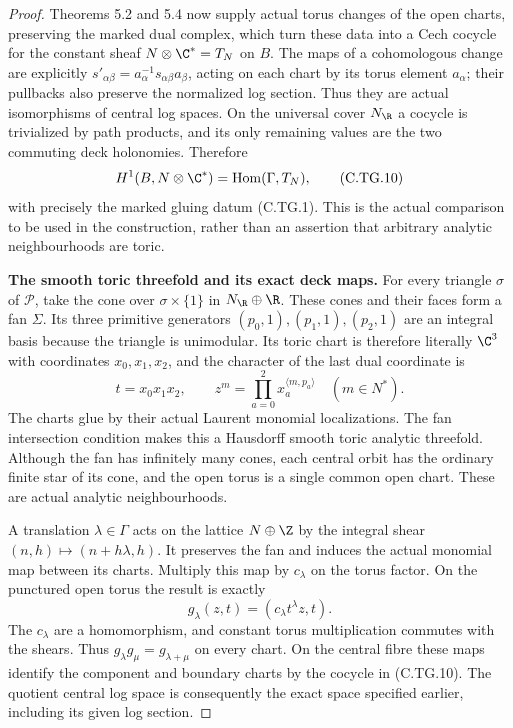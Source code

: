 \begin{proof}
Theorems 5.2 and 5.4 now supply actual torus
changes of the open charts, preserving the
marked dual complex, which turn these data
into a Cech cocycle for the constant sheaf
$N\otimes\C^*=T_N$ on $B$.
The maps of a cohomologous change are explicitly
$s'_{\alpha\beta}=a_\alpha^{-1}
s_{\alpha\beta}a_\beta$, acting on each chart
by its torus element $a_\alpha$; their pullbacks
also preserve the normalized log section.
Thus they are actual isomorphisms of central
log spaces. On the universal cover
$N_{\R}$ a cocycle is trivialized by path
products, and its only remaining values are
the two commuting deck holonomies. Therefore
\[
 H^1(B,N\otimes\C^*)
       =\operatorname{Hom}(\Gamma,T_N),
\tag{C.TG.10}
\]
with precisely the marked gluing datum (C.TG.1).
This is the actual comparison to be used in
the construction, rather than an assertion
that arbitrary analytic neighbourhoods are toric.

\par\medskip\noindent\textbf{The smooth toric threefold and its exact deck maps.}
For every triangle $\sigma$ of $\mathscr P$, take
the cone over $\sigma\times\{1\}$ in
$N_{\R}\oplus\R$. These cones and their faces
form a fan $\Sigma$. Its three primitive
generators $(p_0,1),(p_1,1),(p_2,1)$ are an
integral basis because the triangle is
unimodular. Its toric chart is therefore
literally $\C^3$ with coordinates $x_0,x_1,x_2$,
and the character of the last dual coordinate is
\[
                  t=x_0x_1x_2,
       \qquad z^m=\prod_{a=0}^2x_a^{\langle m,p_a\rangle}
                       \quad(m\in N^*).
\tag{C.TG.11}
\]
The charts glue by their actual Laurent
monomial localizations. The fan intersection
condition makes this a Hausdorff smooth toric
analytic threefold. Although the fan has
infinitely many cones, each central orbit has
the ordinary finite star of its cone, and the
open torus is a single common open chart.
These are actual analytic neighbourhoods.

A translation $\lambda\in\Gamma$ acts on the
lattice $N\oplus\Z$ by the integral shear
$(n,h)\mapsto(n+h\lambda,h)$. It preserves
the fan and induces the actual monomial map
between its charts. Multiply this map by
$c_\lambda$ on the torus factor. On the
punctured open torus the result is exactly
\[
              g_\lambda(z,t)=(c_\lambda t^\lambda z,t).
\tag{C.TG.12}
\]
The $c_\lambda$ are a homomorphism, and
constant torus multiplication commutes with
the shears. Thus $g_\lambda g_\mu=g_{\lambda+\mu}$
on every chart. On the central fibre these
maps identify the component and boundary
charts by the cocycle in (C.TG.10). The
quotient central log space is consequently
the exact space specified earlier, including
its given log section.


\end{proof}
